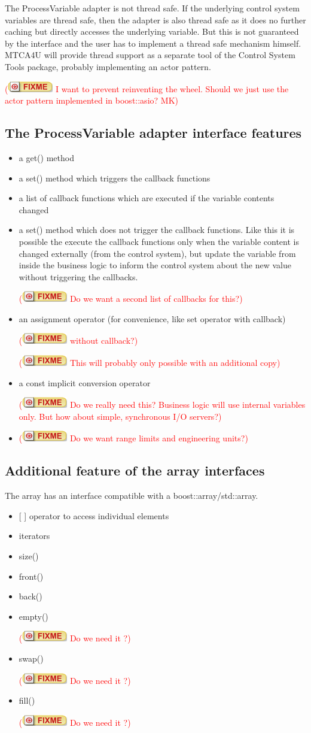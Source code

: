 \documentclass[11pt,a4paper]{scrartcl}
\newcounter{nFixmes}
\newcommand{\fixme}[1]{\addtocounter{nFixmes}{1}\textcolor{red}{(\includegraphics[height=2ex]{fixme} #1)}\xspace}
\begin{document}
The ProcessVariable adapter is not thread safe. If the underlying control
system variables are thread safe, then the adapter is also thread safe as it
does no further caching but directly accesses the underlying variable. But this
is not guaranteed by the interface and the user has to implement a thread safe
mechanism himself. MTCA4U will provide thread support as a separate tool of
the Control System Tools package, probably implementing an actor pattern.
 \fixme{I want to prevent reinventing the
  wheel. Should we just use the actor pattern implemented in boost::asio? MK} 


\subsection{The ProcessVariable adapter interface features}
\begin{itemize}
\item a get() method
\item a set() method which triggers the callback functions
\item a list of callback functions which are executed if the variable contents
  changed
\item a set() method which does not trigger the callback functions. Like this
  it is possible the execute the callback functions only when the variable
  content is changed externally (from the control system), but update the
  variable from inside the business logic to inform the control system about
  the new value without triggering the callbacks. 
  \fixme{Do we want a second list of callbacks for this?}
\item an assignment operator (for convenience, like set operator with
  callback) \fixme{without callback?}
  \fixme{This will probably only possible with an additional copy} 
\item a const implicit conversion operator \fixme{Do we really need this?
  Business logic will use internal variables only. But how about simple,
  synchronous I/O servers?} 
\item \fixme{Do we want range limits and engineering units?}
\end{itemize}

\subsection{Additional feature of the array interfaces}
The array has an interface compatible with a boost::array/std::array.
\begin{itemize}
\item {[ ]} operator to access individual elements
\item iterators
\item size()
\item front()
\item back()
\item empty() \fixme{Do we need it ?}
\item swap() \fixme{Do we need it ?}
\item fill() \fixme{Do we need it ?}
\end{itemize}
\end{document}
